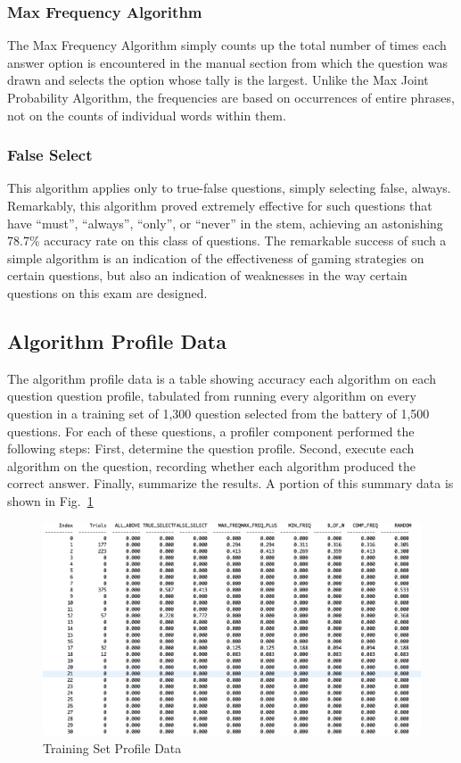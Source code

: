\subsubsection{Max Frequency Algorithm}

The Max Frequency Algorithm simply counts up the total number of times each answer option is encountered in the manual section from which the question was drawn and selects the option whose tally is the largest.  Unlike the Max Joint Probability Algorithm, the frequencies are based on occurrences of entire phrases, not on the counts of individual words within them.

\subsubsection{False Select}

This algorithm applies only to true-false questions, simply selecting false, always.  Remarkably, this algorithm proved extremely effective for such questions that have ``must'', ``always'', ``only'', or ``never'' in the stem, achieving an astonishing 78.7\% accuracy rate on this class of questions.  The remarkable success of such a simple algorithm is an indication of the effectiveness of gaming strategies on certain questions, but also an indication of weaknesses in the way certain questions on this exam are designed.

\subsection{Algorithm Profile Data}

The algorithm profile data is a table showing accuracy each algorithm on each question question profile, tabulated from running every algorithm on every question in a training set of 1,300 question selected from the battery of 1,500 questions.  For each of these questions, a profiler component performed the following steps:  First, determine the question profile.  Second, execute each algorithm on the question, recording whether each algorithm produced the correct answer.  Finally, summarize the results.  A portion of this summary data is shown in Fig.~\ref{fig:profile_data_training_set}

\begin{figure}
\centering
\vspace{2.0in}
\includegraphics[scale=0.25]{profile_data_training_set.png}
\caption{Training Set Profile Data}
\label{fig:profile_data_training_set}
\end{figure}


